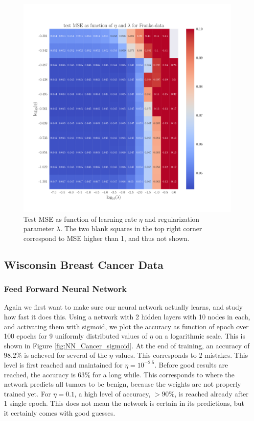 \documentclass[12pt]{extarticle}
\begin{document}
\begin{figure}[h]
	\includegraphics[width=\linewidth]{plots/NN_Franke__eta_lambda__test_MSE__228448.pdf}
	\caption{Test MSE as function of learning rate $\eta$ and regularization parameter $\lambda$. The two blank squares in the top right corner correspond to MSE higher than 1, and thus not shown.}\label{fig:NN_lambda}
\end{figure}


\clearpage
\subsection{Wisconsin Breast Cancer Data}
\subsubsection{Feed Forward Neural Network}


Again we first want to make sure our neural network actually learns, and study how fast it does this. Using a network with 2 hidden layers with 10 nodes in each, and activating them with sigmoid, we plot the accuracy as function of epoch over 100 epochs for 9 uniformly distributed values of $\eta$ on a logarithmic scale. This is shown in Figure \ref{fig:NN_Cancer_sigmoid}. At the end of training, an accuracy of $98.2\%$ is acheved for several of the $\eta$-values. This corresponds to 2 mistakes. This level is first reached and maintained for $\eta=10^{-2.5}$. Before good results are reached, the accuracy is $63\%$ for a long while. This corresponds to where the network predicts all tumors to be benign, because the weights are not properly trained yet. For $\eta=0.1$, a high level of accuracy, $>90\%$, is reached already after 1 single epoch. This does not mean the network is certain in its predictions, but it certainly comes with good guesses.
\end{document}

